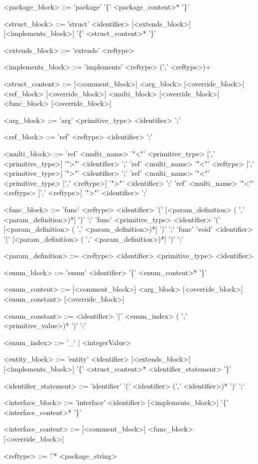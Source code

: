 \documentclass[./einleitung.tex]{subfiles}
\begin{document}
\begin{grammar}
<package_block> ::= 'package' '\{' <package_content>* '\}'

<struct_block> ::= 'struct' <identifier> [<extends_block>] [<implements_block>] '\{' <struct_content>* '\}'


<extends_block> ::= 'extends' <reftype>

<implements_block> ::= 'implements' <reftype> (',' <reftype>)+

<struct_content> ::= [<comment_block>] <arg_block> [<override_block>]
 <ref_block> [<override_block>]
 <multi_block> [<override_block>]
 <func_block> [<override_block>]

<arg_block> ::= 'arg' <primitive_type> <identifier> ';'

<ref_block> ::= 'ref' <reftype> <identifier> ';'

<multi_block> ::= 'ref' <multi_name> '"<"' <primitive_type> [',' <primitive_type>] '">"' <identifier> ';'
\alt 'ref' <multi_name> '"<"' <reftype> [',' <primitive_type>] '">"' <identifier> ';'
\alt 'ref' <multi_name> '"<"' <primitive_type> [',' <reftype>] '">"' <identifier> ';'
\alt 'ref' <multi_name> '"<"' <reftype> [',' <reftype>] '">"' <identifier> ';'

<func_block> ::= 'func' <reftype> <identifier> '(' [<param_definition> ( ',' <param_definition>)*] ')' ';'
\alt 'func' <primitive_type> <identifier> '(' [<param_definition> ( ',' <param_definition>)*] ')' ';'
\alt 'func' 'void' <identifier> '(' [<param_definition> ( ',' <param_definition>)*] ')' ';'

<param_definition> ::= <reftype> <identifier>
\alt <primitive_type> <identifier>

<enum_block> ::= 'enum' <identifier> '\{' <enum_content>* '\}'

<enum_content> ::= [<comment_block>] <arg_block> [<override_block>]
 <enum_constant> [<override_block>]

<enum_constant> ::= <identifier> '(' <enum_index> ( ',' <primitive_value>)* ')' ';'

<enum_index> ::= '_' | <integerValue>

<entity_block> ::= 'entity' <identifier> [<extends_block>] [<implements_block>] '\{' <struct_content>* <identifier_statement> '\}' 

<identifier_statement> ::= 'identifier' '(' <identifier> (',' <identifier>)* ')' ';'

<interface_block> ::= 'interface' <identifier> [<implements_block>] '\{' <interface_content>* '\}'

<interface_content> ::= [<comment_block>] <func_block> [<override_block>]

<reftype> ::= '.'* <package_string>
\end{grammar}
\end{document}

